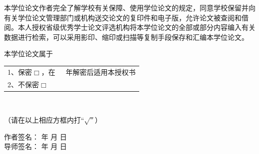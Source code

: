 本学位论文作者完全了解学校有关保障、使用学位论文的规定，同意学校保留并向有关学位论文管理部门或机构送交论文的复印件和电子版，允许论文被查阅和借阅。本人授权省级优秀学士论文评选机构将本学位论文的全部或部分内容编入有关数据进行检索，可以采用影印、缩印或扫描等复制手段保存和汇编本学位论文。\smallskip

本学位论文属于
\begin{tabular}[t]{l}
1、保密$ \Box$，在~~~年解密后适用本授权书  \\ 
2、不保密$ \Box$  \\ 
\end{tabular} \\
\begin{center}
（请在以上相应方框内打“$\surd”$）
\end{center}
\begin{flushright}
 作者签名：  \quad\quad\quad\quad 年 \quad  月  \quad  日\\
导师签名：   \quad\quad\quad\quad 年 \quad  月 \quad   日\\
\end{flushright}
\thispagestyle{empty}
\clearpage